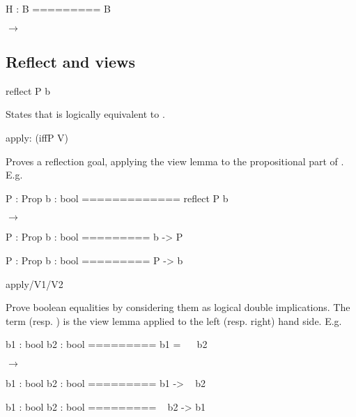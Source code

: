 \begin{landscape}
\begin{small}
\begin{multicols*}{3}[\begin{center}\section*{}\end{center}]
\begin{cheatout}
 H : B
=========
 B
\end{cheatout}
$\to$
\begin{cheatout}
\end{cheatout}



\subsection*{Reflect and views}

\begin{cheat}
reflect P b
\end{cheat}
States that  is logically equivalent to .

\columnbreak

\begin{cheat}
apply: (iffP V)
\end{cheat}

Proves a reflection goal, applying the view
  lemma  to the propositional part of .
  E.g. 


\begin{cheatout}
 P : Prop
 b : bool
=============
 reflect P b
\end{cheatout}
$\to$
\begin{cheatout}
 P : Prop
 b : bool
=========
 b -> P
\end{cheatout}

\noindent\hspace{0.24\textwidth}
\begin{cheatout}
 P : Prop
 b : bool
=========
 P -> b
\end{cheatout}


\begin{cheat}
apply/V1/V2
\end{cheat}
Prove boolean equalities by considering them as
  logical double implications. The term  (resp. ) is the
  view lemma applied to the left (resp. right) hand
  side. E.g. 


\begin{cheatout}
 b1 : bool
 b2 : bool
=========
 b1 = ~~ b2
\end{cheatout}
$\to$
\begin{cheatout}
 b1 : bool
 b2 : bool
=========
 b1 -> ~ b2
\end{cheatout}

\noindent\hspace{0.24\textwidth}
\begin{cheatout}
 b1 : bool
 b2 : bool
=========
 ~ b2 -> b1
\end{cheatout}



\end{multicols*}
\end{small}
\end{landscape}
